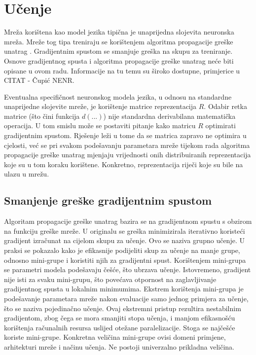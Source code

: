 \documentclass[times, utf8, diplomski, numeric]{fer}
\begin{document}
\section{Učenje}

Mreža korištena kao model jezika tipična je unaprijedna slojevita neuronska mreža. Mreže tog tipa treniraju se korištenjem algoritma propagacije greške unatrag . Gradijentnim spustom se smanjuje greška na skupu za treniranje. Osnove gradijentnog spusta i algoritma propagacije greške unatrag neće biti opisane u ovom radu. Informacije na tu temu su široko dostupne, primjerice u CITAT - Čupić NENR.

Eventualna specifičnost neuronskog modela jezika, u odnosu na standardne unaprijedne slojevite mreže, je korištenje matrice reprezentacija $R$. Odabir retka matrice (što čini funkcija $d(...)$) nije standardna derivabilana matematička operacija. U tom smislu može se postaviti pitanje kako matricu $R$ optimirati gradijentnim spustom. Rješenje leži u tome da se matrica zapravo ne optimira u cjelosti, već se pri svakom podešavanju parametara mreže tijekom rada algoritma propagacije greške unatrag mjenjaju vrijednosti onih distribuiranih reprezentacija koje su u tom koraku korištene. Konkretno, reprezentacija riječi koje su bile na ulazu u mrežu.

\subsection{Smanjenje greške gradijentnim spustom}
\label{sec:nnet_grad}

Algoritam propagacije greške unatrag bazira se na gradijentnom spustu s obzirom na funkciju greške mreže. U originalu se greška minimizirala iterativno koristeći gradijent izračunat na cijelom skupu za učenje. Ovo se naziva grupno  učenje. U praksi se pokazalo kako je efikasnije podijeliti skup za učenje na manje grupe, odnosno mini-grupe  i koristiti njih za gradijentni spust. Korištenjem mini-grupa se parametri modela podešavaju češće, što ubrzava učenje. Istovremeno, gradijent nije isti za svaku mini-grupu, što povećava otpornost na zaglavljivanje gradijentnog spusta u lokalnim minimumima. Ekstrem korištenja mini-grupa je podešavanje parametara mreže nakon evaluacije samo jednog primjera za učenje, što se naziva pojedinačno  učenje. Ovaj ekstremni pristup rezultira nestabilnim gradijentom, zbog čega se mora smanjiti stopa učenja, i manjom efikasnošću korištenja računalnih resursa uslijed otežane paralelizacije. Stoga se najčešće koriste mini-grupe. Konkretna veličina mini-grupe ovisi domeni primjene, arhitekturi mreže i načinu učenja. Ne postoji univerzalno prikladna veličina.
\end{document}
